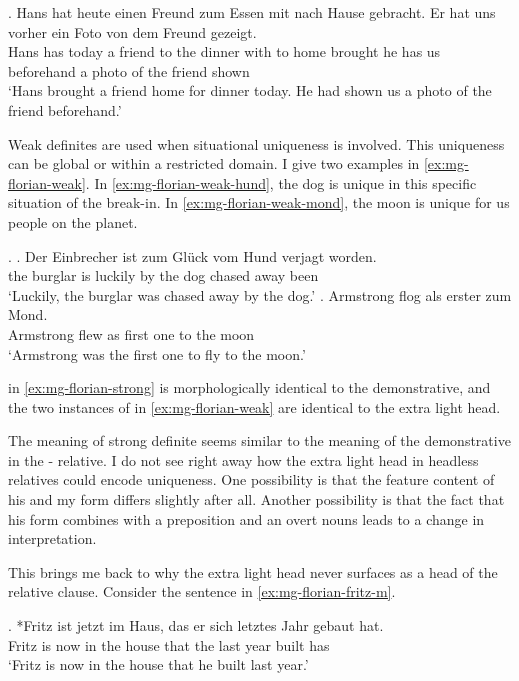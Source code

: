 \exg. Hans hat heute einen Freund zum Essen mit nach Hause gebracht. Er hat uns vorher ein Foto von dem Freund gezeigt.\\
Hans has today a friend {to the} dinner with to home brought he has us beforehand a photo of the friend shown\\
`Hans brought a friend home for dinner today. He had shown us a photo of the friend beforehand.'\label{ex:mg-florian-strong}

Weak definites are used when situational uniqueness is involved. This uniqueness can be global or within a restricted domain. I give two examples in \ref{ex:mg-florian-weak}. In \ref{ex:mg-florian-weak-hund}, the dog is unique in this specific situation of the break-in. In \ref{ex:mg-florian-weak-mond}, the moon is unique for us people on the planet.

\ex.\label{ex:mg-florian-weak}
\ag. Der Einbrecher ist {zum Glück} vom Hund verjagt worden.\\
the burglar is luckily {by the} dog {chased away} been\\
`Luckily, the burglar was chased away by the dog.'\label{ex:mg-florian-weak-hund}
\bg. Armstrong flog als erster zum Mond.\\
Armstrong flew as {first one} {to the} moon\\
`Armstrong was the first one to fly to the moon.' \label{ex:mg-florian-weak-mond}

 in \ref{ex:mg-florian-strong} is morphologically identical to the demonstrative, and the two instances of  in \ref{ex:mg-florian-weak} are identical to the extra light head.

The meaning of  strong definite seems similar to the meaning of the demonstrative in the - relative.
I do not see right away how the extra light head in headless relatives could encode uniqueness. One possibility is that the feature content of his and my form differs slightly after all. Another possibility is that the fact that his form combines with a preposition and an overt nouns leads to a change in interpretation.

This brings me back to why the extra light head never surfaces as a head of the relative clause. Consider the sentence in \ref{ex:mg-florian-fritz-m}.

\exg. *Fritz ist jetzt im Haus, das er sich letztes Jahr gebaut hat.\\
Fritz is now {in the} house that the  last year built has\\
`Fritz is now in the house that he built last year.' \label{ex:mg-florian-fritz-m}

